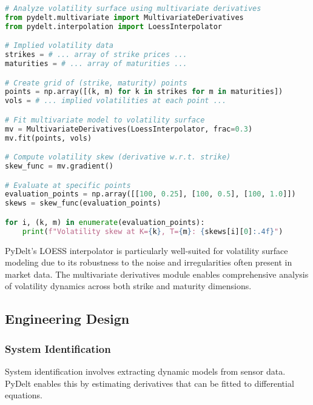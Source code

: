 \documentclass[11pt,a4paper]{article}
\begin{document}
\begin{lstlisting}[language=Python, caption=Volatility surface analysis example]
# Analyze volatility surface using multivariate derivatives
from pydelt.multivariate import MultivariateDerivatives
from pydelt.interpolation import LoessInterpolator

# Implied volatility data
strikes = # ... array of strike prices ...
maturities = # ... array of maturities ...

# Create grid of (strike, maturity) points
points = np.array([(k, m) for k in strikes for m in maturities])
vols = # ... implied volatilities at each point ...

# Fit multivariate model to volatility surface
mv = MultivariateDerivatives(LoessInterpolator, frac=0.3)
mv.fit(points, vols)

# Compute volatility skew (derivative w.r.t. strike)
skew_func = mv.gradient()

# Evaluate at specific points
evaluation_points = np.array([[100, 0.25], [100, 0.5], [100, 1.0]])
skews = skew_func(evaluation_points)

for i, (k, m) in enumerate(evaluation_points):
    print(f"Volatility skew at K={k}, T={m}: {skews[i][0]:.4f}")
\end{lstlisting}

PyDelt's LOESS interpolator is particularly well-suited for volatility surface modeling due to its robustness to the noise and irregularities often present in market data. The multivariate derivatives module enables comprehensive analysis of volatility dynamics across both strike and maturity dimensions.

\subsection{Engineering Design}

\subsubsection{System Identification}

System identification involves extracting dynamic models from sensor data. PyDelt enables this by estimating derivatives that can be fitted to differential equations.
\end{document}
